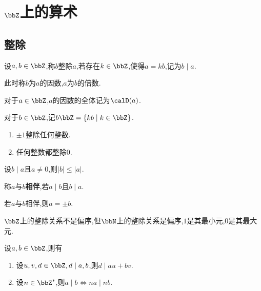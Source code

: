 \chapter{$\bbZ$上的算术}

\section{整除}

\begin{deff}
    设$a, b \in \bbZ$,称$b$整除$a$,若存在$k \in \bbZ$,使得$a = kb$,记为$b \mid a$.

    此时称$b$为$a$的因数,$a$为$b$的倍数.

    对于$a \in \bbZ$,$a$的因数的全体记为$\calD(a)$.

    对于$b \in \bbZ$,记$b \bbZ = \{ kb \mid k \in \bbZ \}$.
\end{deff}

\begin{rqq}
    \begin{enumerate}
        \item $\pm 1$整除任何整数.
        \item 任何整数都整除$0$.
    \end{enumerate}
\end{rqq}

\begin{prop}
    设$b \mid a$且$a \neq 0$,则$\left\lvert b \right\rvert \leqslant \left\lvert a \right\rvert$.
\end{prop}

\begin{deff}
    称$a$与$b$\textbf{相伴},若$a \mid b$且$b \mid a$.
\end{deff}

\begin{prop}
    若$a$与$b$相伴,则$a = \pm b$.
\end{prop}

\begin{rqq}
    $\bbZ$上的整除关系不是偏序,但$\bbN$上的整除关系是偏序,$1$是其最小元,$0$是其最大元.
\end{rqq}

\begin{prop}
    设$a, b \in \bbZ$,则有
    \begin{enumerate}
        \item 设$u, v, d \in \bbZ, d \mid a,b$,则$d \mid au + bv$.
        \item 设$n \in \bbZ^*$,则$a \mid b \iff na \mid nb$.
    \end{enumerate}
\end{prop}

